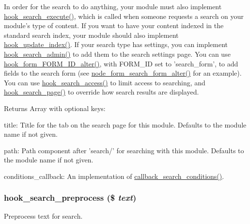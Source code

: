 In order for the search to do anything, your module must also implement \hyperlink{group__search_ga00be3e4a3b64ad73f8ad1304a450cee5}{hook\_\-search\_\-execute()}, which is called when someone requests a search on your module's type of content. If you want to have your content indexed in the standard search index, your module should also implement \hyperlink{group__search_ga23d6f6642bd53c4f033f10e9c1b12d43}{hook\_\-update\_\-index()}. If your search type has settings, you can implement \hyperlink{group__search_gae7c7a4e3d4ee63b5aab3742b0e12624e}{hook\_\-search\_\-admin()} to add them to the search settings page. You can use \hyperlink{group__hooks_ga8d4a4089551493d55911bd5c4f218264}{hook\_\-form\_\-FORM\_\-ID\_\-alter()}, with FORM\_\-ID set to 'search\_\-form', to add fields to the search form (see \hyperlink{node_8module_aafba59926e9d0a8e6f81cbb776cba7ef}{node\_\-form\_\-search\_\-form\_\-alter()} for an example). You can use \hyperlink{group__search_gac49e6fd7370e65efeaf484ec992de1f0}{hook\_\-search\_\-access()} to limit access to searching, and \hyperlink{group__hooks_ga422b9506b3dfd8ed5aa8bfaea98844b9}{hook\_\-search\_\-page()} to override how search results are displayed.

\begin{DoxyReturn}{Returns}
Array with optional keys:
\begin{DoxyItemize}
\item title: Title for the tab on the search page for this module. Defaults to the module name if not given.
\item path: Path component after 'search/' for searching with this module. Defaults to the module name if not given.
\item conditions\_\-callback: An implementation of \hyperlink{group__search_gab59b17cb3637c3acccf3c73cd5c1195d}{callback\_\-search\_\-conditions()}. 
\end{DoxyItemize}
\end{DoxyReturn}
\hypertarget{group__search_ga3c935c295da9103bc7184f6ec869c533}{
\subsubsection[{hook\_\-search\_\-preprocess}]{\setlength{\rightskip}{0pt plus 5cm}hook\_\-search\_\-preprocess (\$ {\em text})}}
\label{group__search_ga3c935c295da9103bc7184f6ec869c533}
Preprocess text for search.

